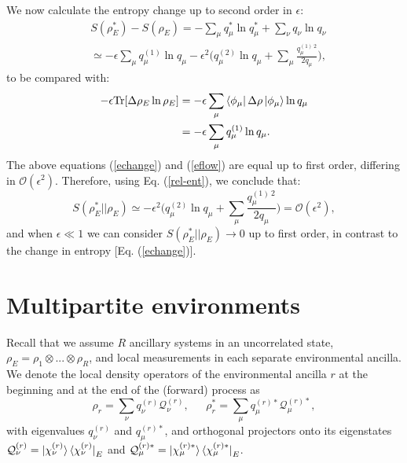 \documentclass[aps,prx,twocolumn,showpacs,floatfix,superscriptaddress,graphics,longbibliography]{revtex4-1}
\newcommand{\tr}{\mathrm{Tr}}
\newcommand{\HAT}{}
\begin{document}
We now calculate the entropy change up to second order in $\epsilon$:
\begin{eqnarray} \label{echange}
  & S(\rho_E^\ast) - S(\rho_E)  = - \sum_\mu q_\mu^\ast \ln q_\mu^\ast + \sum_\nu q_\nu \ln q_\nu \nonumber \\ 
  & \simeq - \epsilon \sum_\mu q_\mu^{(1)} \ln q_\mu - \epsilon^2 \big(q_\mu^{(2)} \ln q_\mu + \sum_\mu \frac{q_\mu^{(1)~2}}{2 q_\mu} \big), 
\end{eqnarray}
to be compared with:
\begin{align} \label{eflow}
- \epsilon \tr[\Delta \rho_E \ln \rho_E] & = - \epsilon \sum_\mu \bra{\phi_\mu} \Delta \rho \ket{\phi_\mu} \ln q_\mu \nonumber \\ 
& = - \epsilon \sum_\mu q_\mu^{(1)} \ln q_\mu.
\end{align}
The above equations (\ref{echange}) and (\ref{eflow}) are equal up to first order, differing in $\mathcal{O}(\epsilon^2)$. Therefore, using Eq. (\ref{rel-ent}), we conclude that:
\begin{equation}
 S(\rho_E^\ast || \rho_E) \simeq - \epsilon^2 \big(q_\mu^{(2)} \ln q_\mu + \sum_\mu \frac{q_\mu^{(1)~2}}{2 q_\mu} \big) = \mathcal{O}(\epsilon^2), 
\end{equation}
and when $\epsilon \ll 1$ we can consider $S(\rho_E^\ast || \rho_E) \rightarrow 0$ up to first order, in contrast to the change in entropy [Eq. (\ref{echange})].




\section{Multipartite environments} \label{appB}

Recall that we assume $R$ ancillary systems in an uncorrelated state, $\rho_E = \rho_1 \otimes ... \otimes \rho_R$, and local measurements in each separate environmental ancilla. 
We denote the local density operators of the environmental ancilla $r$ at the beginning and at the end of the (forward) process as
\begin{equation}
\rho_r = \sum_{\nu} q^{(r)}_{\nu} \HAT{\mathcal{Q}}^{(r)}_{\nu}, ~~~~~~~ \rho_r^\ast = \sum_{\mu} q^{(r) \ast}_{\mu} \HAT{\mathcal{Q}}^{(r) \ast}_{\mu}, 
\end{equation}
with eigenvalues $q^{(r)}_{\nu}$ and $q^{(r) \ast}_{\mu}$, and orthogonal projectors onto its eigenstates $\HAT{\mathcal{Q}}^{(r)}_{\nu} = \ket{\chi^{(r)}_{\nu}}\bra{\chi^{(r)}_{\nu}}_E$ and 
$\HAT{\mathcal{Q}}^{(r) \ast}_{\mu} = \ket{\chi^{(r) \ast}_{\mu}}\bra{\chi^{(r) \ast}_{\mu}}_E$.
\end{document}
